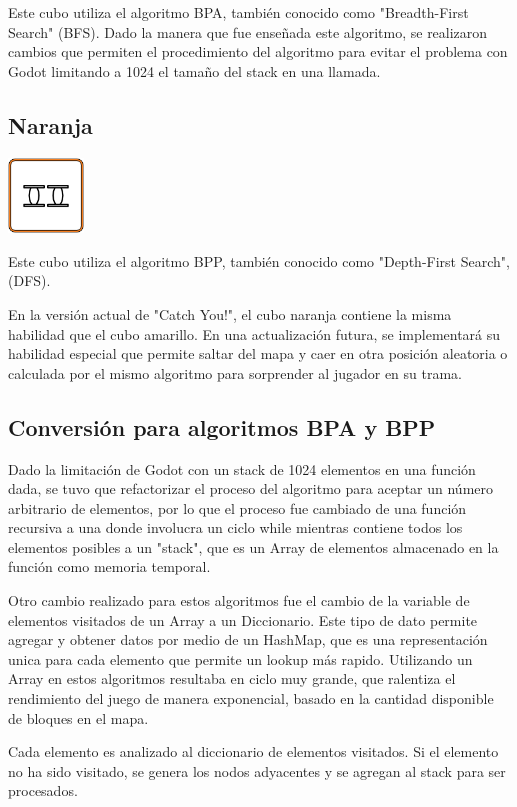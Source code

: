 \documentclass{article}
\begin{document}
Este cubo utiliza el algoritmo BPA, también conocido como "Breadth-First Search" (BFS).
Dado la manera que fue enseñada este algoritmo, se realizaron cambios que permiten el procedimiento del algoritmo para evitar el problema
con Godot limitando a 1024 el tamaño del stack en una llamada.

\subsection{Naranja}

\includegraphics[width = 20mm]{_enem-naranja.png}

Este cubo utiliza el algoritmo BPP, también conocido como "Depth-First Search", (DFS).

En la versión actual de "Catch You!", el cubo naranja contiene la misma habilidad que el cubo amarillo.
En una actualización futura, se implementará su habilidad especial que permite saltar del mapa y caer en otra posición
aleatoria o calculada por el mismo algoritmo para sorprender al jugador en su trama.

\subsection{Conversión para algoritmos BPA y BPP}

Dado la limitación de Godot con un stack de 1024 elementos en una función dada, se tuvo que refactorizar el proceso del algoritmo
para aceptar un número arbitrario de elementos, por lo que el proceso fue cambiado de una función recursiva a una donde involucra un
ciclo while mientras contiene todos los elementos posibles a un "stack", que es un Array de elementos almacenado en la función como memoria
temporal.

Otro cambio realizado para estos algoritmos fue el cambio de la variable de elementos visitados de un Array a un Diccionario. Este tipo de dato
permite agregar y obtener datos por medio de un HashMap, que es una representación unica para cada elemento que permite un lookup más rapido.
Utilizando un Array en estos algoritmos resultaba en ciclo muy grande, que ralentiza el rendimiento del juego de manera exponencial, basado en la cantidad
disponible de bloques en el mapa.

Cada elemento es analizado al diccionario de elementos visitados. Si el elemento no ha sido visitado, se genera los nodos adyacentes y se agregan
al stack para ser procesados.
\end{document}

